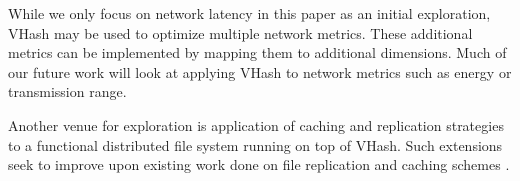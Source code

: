 \documentclass[10pt, conference, letterpaper]{IEEEtran}
\begin{document}
While we only focus on network latency in this paper as an initial exploration, VHash may be used to optimize multiple network metrics.
These additional metrics can be implemented by mapping them to additional dimensions.
Much of our future work will look at applying VHash to network metrics such as energy or transmission range.
 


Another venue for exploration is application of caching and replication strategies to a functional distributed file system running on top of VHash.  Such extensions seek to improve upon existing work done on file replication and caching schemes \cite{shen2010irm}.







\end{document}
